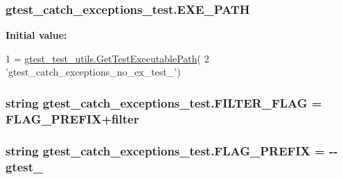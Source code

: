 \subsubsection[{\texorpdfstring{E\+X\+E\+\_\+\+P\+A\+TH}{EXE_PATH}}]{\setlength{\rightskip}{0pt plus 5cm}gtest\+\_\+catch\+\_\+exceptions\+\_\+test.\+E\+X\+E\+\_\+\+P\+A\+TH}\hypertarget{namespacegtest__catch__exceptions__test_a164e7815d55b13a811ce60e2e6f9448d}{}\label{namespacegtest__catch__exceptions__test_a164e7815d55b13a811ce60e2e6f9448d}
{\bfseries Initial value\+:}
\begin{DoxyCode}
1 = \hyperlink{namespacegtest__test__utils_a89ed3717984a80ffbb7a9c92f71b86a2}{gtest\_test\_utils.GetTestExecutablePath}(
2     \textcolor{stringliteral}{'gtest\_catch\_exceptions\_no\_ex\_test\_'})
\end{DoxyCode}
\subsubsection[{\texorpdfstring{F\+I\+L\+T\+E\+R\+\_\+\+F\+L\+AG}{FILTER_FLAG}}]{\setlength{\rightskip}{0pt plus 5cm}string gtest\+\_\+catch\+\_\+exceptions\+\_\+test.\+F\+I\+L\+T\+E\+R\+\_\+\+F\+L\+AG = {\bf F\+L\+A\+G\+\_\+\+P\+R\+E\+F\+IX}+\textquotesingle{}filter\textquotesingle{}}\hypertarget{namespacegtest__catch__exceptions__test_a1a53cfa4c10fe3bdbc85a14fd9692751}{}\label{namespacegtest__catch__exceptions__test_a1a53cfa4c10fe3bdbc85a14fd9692751}
\subsubsection[{\texorpdfstring{F\+L\+A\+G\+\_\+\+P\+R\+E\+F\+IX}{FLAG_PREFIX}}]{\setlength{\rightskip}{0pt plus 5cm}string gtest\+\_\+catch\+\_\+exceptions\+\_\+test.\+F\+L\+A\+G\+\_\+\+P\+R\+E\+F\+IX = \textquotesingle{}-\/-\/gtest\+\_\+\textquotesingle{}}\hypertarget{namespacegtest__catch__exceptions__test_a2d40f89077ec9fdb51008c263148315f}{}\label{namespacegtest__catch__exceptions__test_a2d40f89077ec9fdb51008c263148315f}
